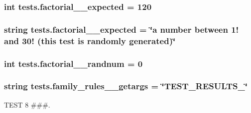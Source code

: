 \subsubsection[{factorial\+\_\+2\+\_\+expected}]{\setlength{\rightskip}{0pt plus 5cm}int tests.\+factorial\+\_\+\_\+expected = 120}\label{namespacetests_ad75ade2f76275339e399cef79961ef0a}
\hypertarget{namespacetests_aaf40b373592b31f28f148fcee71328aa}{}
\subsubsection[{factorial\+\_\+3\+\_\+expected}]{\setlength{\rightskip}{0pt plus 5cm}string tests.\+factorial\+\_\+\_\+expected = \char`\"{}a number between 1! and 30! (this test is randomly generated)\char`\"{}}\label{namespacetests_aaf40b373592b31f28f148fcee71328aa}
\hypertarget{namespacetests_a3d9a186d2218e756c775fe6936e7ca4c}{}
\subsubsection[{factorial\+\_\+3\+\_\+randnum}]{\setlength{\rightskip}{0pt plus 5cm}int tests.\+factorial\+\_\+\_\+randnum = 0}\label{namespacetests_a3d9a186d2218e756c775fe6936e7ca4c}
\hypertarget{namespacetests_a68495c75d747bdf4a92ed522c37759ae}{}
\subsubsection[{family\+\_\+rules\+\_\+1\+\_\+getargs}]{\setlength{\rightskip}{0pt plus 5cm}string tests.\+family\+\_\+rules\+\_\+\_\+getargs = \char`\"{}T\+E\+S\+T\+\_\+\+R\+E\+S\+U\+L\+T\+S\+\_\char`\"{}}\label{namespacetests_a68495c75d747bdf4a92ed522c37759ae}


T\+E\+S\+T 8 \#\#\#. 

\hypertarget{namespacetests_afd1704baf70a82cfa545df15dce643e8}{}
